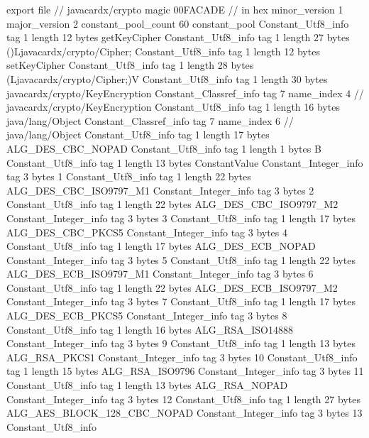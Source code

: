 export file {		// javacardx/crypto
	magic	00FACADE		 // in hex
	minor_version	1
	major_version	2
	constant_pool_count	60
	constant_pool {
		Constant_Utf8_info {
			tag	1
			length	12
			bytes	getKeyCipher
		}
		Constant_Utf8_info {
			tag	1
			length	27
			bytes	()Ljavacardx/crypto/Cipher;
		}
		Constant_Utf8_info {
			tag	1
			length	12
			bytes	setKeyCipher
		}
		Constant_Utf8_info {
			tag	1
			length	28
			bytes	(Ljavacardx/crypto/Cipher;)V
		}
		Constant_Utf8_info {
			tag	1
			length	30
			bytes	javacardx/crypto/KeyEncryption
		}
		Constant_Classref_info {
			tag	7
			name_index	4		// javacardx/crypto/KeyEncryption
		}
		Constant_Utf8_info {
			tag	1
			length	16
			bytes	java/lang/Object
		}
		Constant_Classref_info {
			tag	7
			name_index	6		// java/lang/Object
		}
		Constant_Utf8_info {
			tag	1
			length	17
			bytes	ALG_DES_CBC_NOPAD
		}
		Constant_Utf8_info {
			tag	1
			length	1
			bytes	B
		}
		Constant_Utf8_info {
			tag	1
			length	13
			bytes	ConstantValue
		}
		Constant_Integer_info {
			tag	3
			bytes	1
		}
		Constant_Utf8_info {
			tag	1
			length	22
			bytes	ALG_DES_CBC_ISO9797_M1
		}
		Constant_Integer_info {
			tag	3
			bytes	2
		}
		Constant_Utf8_info {
			tag	1
			length	22
			bytes	ALG_DES_CBC_ISO9797_M2
		}
		Constant_Integer_info {
			tag	3
			bytes	3
		}
		Constant_Utf8_info {
			tag	1
			length	17
			bytes	ALG_DES_CBC_PKCS5
		}
		Constant_Integer_info {
			tag	3
			bytes	4
		}
		Constant_Utf8_info {
			tag	1
			length	17
			bytes	ALG_DES_ECB_NOPAD
		}
		Constant_Integer_info {
			tag	3
			bytes	5
		}
		Constant_Utf8_info {
			tag	1
			length	22
			bytes	ALG_DES_ECB_ISO9797_M1
		}
		Constant_Integer_info {
			tag	3
			bytes	6
		}
		Constant_Utf8_info {
			tag	1
			length	22
			bytes	ALG_DES_ECB_ISO9797_M2
		}
		Constant_Integer_info {
			tag	3
			bytes	7
		}
		Constant_Utf8_info {
			tag	1
			length	17
			bytes	ALG_DES_ECB_PKCS5
		}
		Constant_Integer_info {
			tag	3
			bytes	8
		}
		Constant_Utf8_info {
			tag	1
			length	16
			bytes	ALG_RSA_ISO14888
		}
		Constant_Integer_info {
			tag	3
			bytes	9
		}
		Constant_Utf8_info {
			tag	1
			length	13
			bytes	ALG_RSA_PKCS1
		}
		Constant_Integer_info {
			tag	3
			bytes	10
		}
		Constant_Utf8_info {
			tag	1
			length	15
			bytes	ALG_RSA_ISO9796
		}
		Constant_Integer_info {
			tag	3
			bytes	11
		}
		Constant_Utf8_info {
			tag	1
			length	13
			bytes	ALG_RSA_NOPAD
		}
		Constant_Integer_info {
			tag	3
			bytes	12
		}
		Constant_Utf8_info {
			tag	1
			length	27
			bytes	ALG_AES_BLOCK_128_CBC_NOPAD
		}
		Constant_Integer_info {
			tag	3
			bytes	13
		}
		Constant_Utf8_info {
}}}

